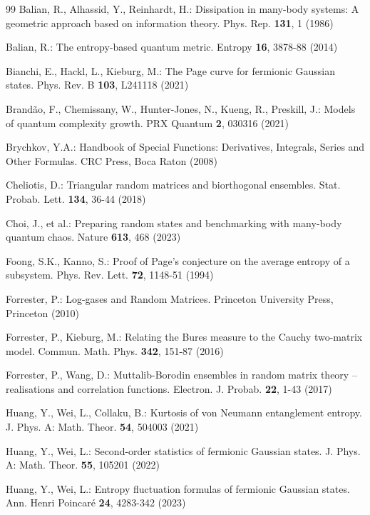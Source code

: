 \documentclass[pdflatex,sn-mathphys-num]{sn-jnl}%
\theoremstyle{thmstyleone}
\begin{document}
\begin{thebibliography}{99}
Balian, R., Alhassid, Y., Reinhardt, H.: Dissipation in many-body systems: A geometric approach based on information theory. Phys. Rep. {\bf 131}, 1 (1986)

Balian, R.: The entropy-based quantum metric. Entropy {\bf 16}, 3878-88 (2014)

Bianchi, E., Hackl, L., Kieburg, M.: The Page curve for fermionic Gaussian states. Phys. Rev. B {\bf 103}, L241118 (2021)

Brand\~ao, F., Chemissany, W., Hunter-Jones, N., Kueng, R., Preskill, J.: Models of quantum complexity growth. PRX Quantum {\bf 2}, 030316 (2021)

Brychkov, Y.A.: Handbook of Special Functions: Derivatives, Integrals, Series and Other Formulas. CRC Press, Boca Raton (2008)

Cheliotis, D.: Triangular random matrices and biorthogonal ensembles. Stat. Probab. Lett. {\bf 134}, 36-44 (2018)

Choi, J., et al.: Preparing random states and benchmarking with many-body quantum chaos. Nature {\bf 613}, 468 (2023)

Foong, S.K., Kanno, S.: Proof of Page's conjecture on the average entropy of a subsystem. Phys. Rev. Lett. {\bf 72}, 1148-51 (1994)

Forrester, P.: Log-gases and Random Matrices. Princeton University Press, Princeton (2010)

Forrester, P., Kieburg, M.: Relating the Bures measure to the Cauchy two-matrix model. Commun. Math. Phys. {\bf 342}, 151-87 (2016)

Forrester, P., Wang, D.: Muttalib-Borodin ensembles in random matrix theory -- realisations and correlation functions. Electron. J. Probab. {\bf 22}, 1-43 (2017)

Huang, Y., Wei, L., Collaku, B.: Kurtosis of von Neumann entanglement entropy. J. Phys. A: Math. Theor. {\bf 54}, 504003 (2021)

Huang, Y., Wei, L.: Second-order statistics of fermionic Gaussian states. J. Phys. A: Math. Theor. {\bf 55}, 105201 (2022)

Huang, Y., Wei, L.: Entropy fluctuation formulas of fermionic Gaussian states. Ann. Henri Poincar\'{e} {\bf 24}, 4283-342 (2023)


\end{thebibliography}
\end{document}
